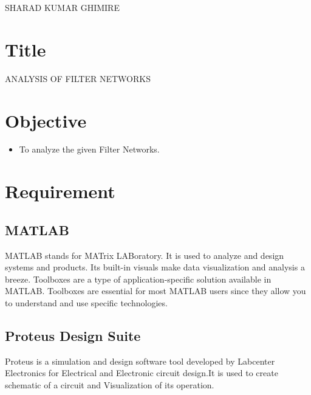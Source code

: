 \documentclass[a4paper,11pt]{article}
\begin{document}
{SHARAD KUMAR GHIMIRE}

\renewcommand{\contentsname}{Table of Contents}
\tableofcontents

\vspace{5em}
\lstlistoflistings
\pagebreak
\listoffigures
\pagebreak
{}

\section{Title} {\large ANALYSIS OF FILTER NETWORKS}
\section{Objective}
\begin{itemize}
    \item To analyze the given Filter Networks.

\end{itemize}
\section{Requirement}

\subsection{MATLAB}

MATLAB stands for MATrix LABoratory. It is used to analyze and design systems and products.  Its built-in visuals make data visualization and analysis a breeze. Toolboxes are a type of application-specific solution available in MATLAB. Toolboxes are essential for most MATLAB users since they allow you to understand and use specific technologies.

\subsection{Proteus Design Suite}

Proteus is a simulation and design software tool developed by Labcenter Electronics for Electrical
and Electronic circuit design.It is used to create schematic  of a circuit and Visualization of its operation.

\end{document}
